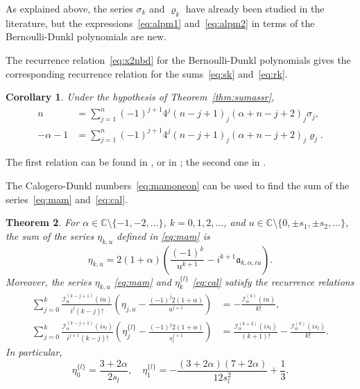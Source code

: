 \documentclass[10pt,a4paper]{article}
\theoremstyle{plain}
\newtheorem{theorem}{Theorem}[section]
\newtheorem{corollary}[theorem]{Corollary}
\theoremstyle{definition}
\numberwithin{equation}{section} %
\newcommand{\I}{\mathcal{I}}
\newcommand{\am}{\mathfrak{a}}
\newcommand{\CC}{\mathbb{C}}
\begin{document}
As explained above, the series $\sigma_k$ and $\varrho_k$ have already been studied in the literature, but the expressions~\eqref{eq:alpm1} and~\eqref{eq:alpm2} in terms of the Bernoulli-Dunkl polynomials are new.

The recurrence relation~\eqref{eq:x2nbd} for the Bernoulli-Dunkl polynomials gives the corresponding recurrence relation for the sums~\eqref{eq:sk} and~\eqref{eq:rk}.

\begin{corollary}
Under the hypothesis of Theorem~\ref{thm:sumassr},
\begin{align*}
  n &= \sum_{j=1}^n (-1)^{j+1}4^j(n-j+1)_j (\alpha+n-j+2)_j \sigma_{j}, \\
  -\alpha-1 &= \sum_{j=1}^n (-1)^{j+1}4^j(n-j+1)_j(\alpha+n-j+2)_j \varrho_{j}.
\end{align*}
\end{corollary}

The first relation can be found in \cite[p.~149]{Sne}, or in
\cite[identity~(14)]{Ki}; the second one in \cite[p.~151]{Sne}.

The Calogero-Dunkl numbers~\eqref{eq:mamoneon} can be used to find the sum of the series~\eqref{eq:mam} and~\eqref{eq:cal}.

\begin{theorem}
\label{thm:cag}
For $\alpha \in \CC\setminus\{-1,-2,\dots\}$, $k=0,1,2,\dots$, and
$u\in \CC\setminus\{0, \pm s_1,\allowbreak\pm s_2,\dots\}$, the sum of the series $\eta_{k,u}$ defined in \eqref{eq:mam} is
\begin{equation}
\label{eq:mam1i}
  \eta_{k,u} = 2(1+\alpha) \left(\frac{(-1)^k}{u^{k+1}}-i^{k+1}\am_{k,\alpha,iu}\right).
\end{equation}
Moreover, the series $\eta_{k,u}$ \eqref{eq:mam} and $\eta_k^{\{l\}}$ \eqref{eq:cal} satisfy the recurrence relations
\begin{align}
\label{eq:mam1}
  \sum_{j=0}^k \frac{\I_\alpha^{(k-j+1)}(iu)}{i^j(k-j)!}
  \left(\eta_{j,u}-\frac{(-1)^j 2(1+\alpha)}{u^{j+1}}\right)
  &= -\frac{\I_\alpha^{(k)}(iu)}{k!}, \\
\label{eq:mam0}
  \sum_{j=0}^k \frac{\I_\alpha^{(k-j+1)}(is_l)}{i^{j+1}(k-j)!}
  \left(\eta_j^{\{l\}}-\frac{(-1)^j 2(1+\alpha)}{s_l^{j+1}}\right)
  &= \frac{\I_\alpha^{(k+2)}(is_l)}{(k+1)!} - \frac{\I_\alpha^{(k)}(is_l)}{k!}.
\end{align}
In particular,
\begin{equation}
\label{eq:cal1}
  \eta_0^{\{l\}} = \frac{3+2\alpha}{2s_l},\quad
  \eta_1^{\{l\}} = -\frac{(3+2\alpha)(7+2\alpha)}{12s_l^2}+\frac{1}{3}.
\end{equation}
\end{theorem}
\end{document}
